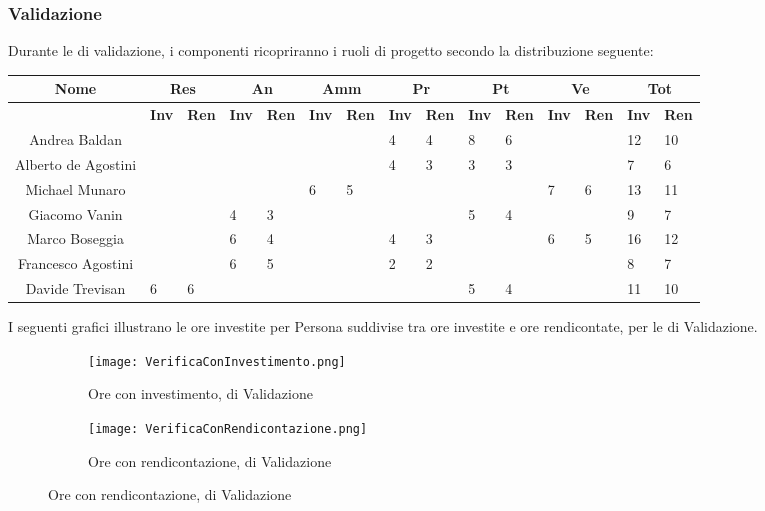 \documentclass{scalatekids-article}
\begin{document}
\subsubsection{Validazione}
Durante le  di validazione, i componenti ricopriranno i ruoli di progetto secondo la distribuzione seguente:
\begin{center}
  \scriptsize
  \begin{tabular}{| c | p{0.35cm}  p{0.35cm} | p{0.35cm}  p{0.35cm} | p{0.35cm}  p{0.35cm} | p{0.35cm}  p{0.35cm} | p{0.35cm}  p{0.35cm} | p{0.35cm}  p{0.35cm} | p{0.35cm}  p{0.35cm} |}
    \hline
    \textbf{Nome} & \multicolumn{2}{|c|}{\textbf{Res}} & \multicolumn{2}{|c|}{\textbf{An}} & \multicolumn{2}{|c|}{\textbf{Amm}} & \multicolumn{2}{|c|}{\textbf{Pr}} & \multicolumn{2}{|c|}{\textbf{Pt}} & \multicolumn{2}{|c|}{\textbf{Ve}} & \multicolumn{2}{|c|}{\textbf{Tot}}\\

    \hline
    & \textbf{Inv} & \textbf{Ren} & \textbf{Inv} & \textbf{Ren} & \textbf{Inv} & \textbf{Ren} & \textbf{Inv} & \textbf{Ren} & \textbf{Inv} & \textbf{Ren} & \textbf{Inv} & \textbf{Ren} & \textbf{Inv} & \textbf{Ren}\\
    \hline
    Andrea Baldan & & & & & & & 4 & 4 & 8 & 6 & & & 12 & 10\\
    Alberto de Agostini & & & & & & & 4 & 3 & 3 & 3 & & & 7 & 6\\
    Michael Munaro & & & & & 6 & 5 & & & & & 7 & 6 & 13 & 11\\
    Giacomo Vanin & & & 4 & 3 & & & & & 5 & 4 & & & 9 & 7\\
    Marco Boseggia & & & 6 & 4 & & & 4 & 3 & & & 6 & 5 & 16 & 12\\
    Francesco Agostini & & & 6 & 5 & & & 2 & 2 & & & & & 8 & 7\\
    Davide Trevisan & 6 & 6 & & & & & & & 5 & 4 & & & 11 & 10\\
    \hline
  \end{tabular}
\end{center}
\normalsize I seguenti grafici illustrano le ore investite per Persona suddivise
tra ore investite e ore rendicontate, per le  di Validazione.
\begin{figure}[H]
  \begin{subfigure}[H]{0.47\textwidth}
    \texttt{[image: VerificaConInvestimento.png]}
    \caption*{Ore con investimento,  di Validazione}
  \end{subfigure}
  \qquad
  \begin{subfigure}[H]{0.47\textwidth}
    \texttt{[image: VerificaConRendicontazione.png]}
    \caption*{Ore con rendicontazione,  di Validazione}
  \end{subfigure}
\end{figure}
\end{document}
